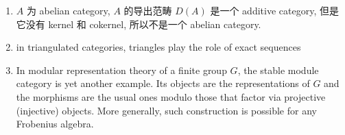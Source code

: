 \documentclass{ctexart}
\begin{document}
\begin{enumerate}
\item $A$ 为 abelian category, $A$ 的导出范畴 $D(A)$ 是一个 additive category, 但是它没有 kernel 和 cokernel, 所以不是一个 abelian category.

\item  in triangulated categories, triangles play the role of exact sequences\cite{triangulated_category}

\item  In modular representation theory of a finite group $G$, the stable module category is yet another example. Its objects are the representations of $G$ and the morphisms are the usual ones modulo those that factor via projective (injective) objects. More generally, such construction is possible for any Frobenius algebra.\cite{triangulated_category}
\end{enumerate}
\newpage
\printbibliography
\end{document}
